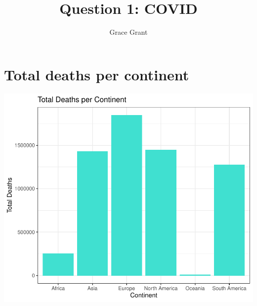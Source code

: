 \documentclass[11pt,preprint, authoryear]{elsarticle}
\numberwithin{equation}{section}
\numberwithin{figure}{section}
\numberwithin{table}{section}
\begin{document}
\begin{frontmatter}  %

\title{Question 1: COVID}





\author[Add1]{Grace Grant}





\address[Add1]{Stellenbosch University, Stellenbosch, South Africa}



\vspace{1cm}





\vspace{0.5cm}

\end{frontmatter}

\setcounter{footnote}{0}



\pagestyle{fancy}
\chead{}
\rhead{}
\lfoot{}
\lhead{}
\cfoot{}


\headsep 35pt %




\hypertarget{total-deaths-per-continent}{%
\section{Total deaths per continent}\label{total-deaths-per-continent}}

\includegraphics{Question-1_files/figure-latex/unnamed-chunk-1-1.pdf}
\end{document}
